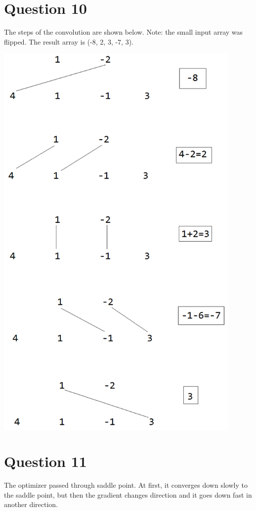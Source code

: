 \documentclass[10pt]{article}
\begin{document}
\section{Question 10}
The steps of the convolution are shown below. Note: the small input array was flipped. The result array is (-8, 2, 3, -7, 3).
\begin{center}
\includegraphics[width=0.9\textwidth]{20220503 Q10.PNG}
\end{center}

\section{Question 11}
The optimizer passed through saddle point. At first, it converges down slowly to the saddle point, but then the gradient changes direction and it goes down fast in another direction.
\end{document}
